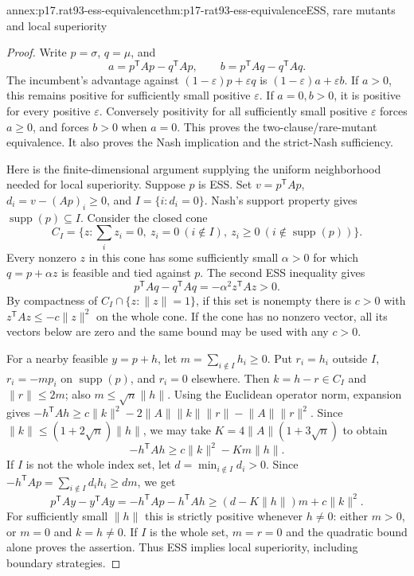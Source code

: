 \begin{annexitem}{annex:p17.rat93-ess-equivalence}{thm:p17-rat93-ess-equivalence}{ESS, rare mutants and local superiority}
\begin{proof}
Write \(p=\sigma\), \(q=\mu\), and
\[
 a=p^{\mathsf T}Ap-q^{\mathsf T}Ap,\qquad
 b=p^{\mathsf T}Aq-q^{\mathsf T}Aq.
\]
The incumbent's advantage against \((1-\varepsilon)p+\varepsilon q\)
is \((1-\varepsilon)a+\varepsilon b\). If \(a>0\), this remains
positive for sufficiently small positive \(\varepsilon\). If
\(a=0,b>0\), it is positive for every positive \(\varepsilon\).
Conversely positivity for all sufficiently small positive
\(\varepsilon\) forces \(a\geq0\), and forces \(b>0\) when
\(a=0\). This proves the two-clause/rare-mutant equivalence. It
also proves the Nash implication and the strict-Nash sufficiency.

Here is the finite-dimensional argument supplying the uniform
neighborhood needed for local superiority. Suppose \(p\) is ESS.
Set \(v=p^{\mathsf T}Ap\),
\(d_i=v-(Ap)_i\geq0\), and
\(I=\{i:d_i=0\}\). Nash's support property gives
\(\operatorname{supp}(p)\subseteq I\).
Consider the closed cone
\[
 C_I=\{z:\sum_i z_i=0,\ z_i=0\ (i\notin I),
                \ z_i\geq0\ (i\notin\operatorname{supp}(p))\}.
\]
Every nonzero \(z\) in this cone has some sufficiently small
\(\alpha>0\) for which \(q=p+\alpha z\) is feasible and tied
against \(p\). The second ESS inequality gives
\[
 p^{\mathsf T}Aq-q^{\mathsf T}Aq=-\alpha^2z^{\mathsf T}Az>0.
\]
By compactness of \(C_I\cap\{z:\lVert z\rVert=1\}\), if this
set is nonempty there is \(c>0\) with
\(z^{\mathsf T}Az\leq-c\lVert z\rVert^2\) on the whole cone.
If the cone has no nonzero vector, all its vectors below are zero
and the same bound may be used with any \(c>0\).

For a nearby feasible \(y=p+h\), let
\(m=\sum_{i\notin I}h_i\geq0\). Put \(r_i=h_i\) outside
\(I\), \(r_i=-mp_i\) on \(\operatorname{supp}(p)\), and
\(r_i=0\) elsewhere. Then \(k=h-r\in C_I\) and
\(\lVert r\rVert\leq2m\); also \(m\leq\sqrt n\lVert h\rVert\).
Using the Euclidean operator norm, expansion gives
\(-h^{\mathsf T}Ah\geq c\lVert k\rVert^2
-2\lVert A\rVert\lVert k\rVert\lVert r\rVert
-\lVert A\rVert\lVert r\rVert^2\).
Since \(\lVert k\rVert\leq(1+2\sqrt n)\lVert h\rVert\),
we may take \(K=4\lVert A\rVert(1+3\sqrt n)\) to obtain
\[
 -h^{\mathsf T}Ah\geq c\lVert k\rVert^2-Km\lVert h\rVert.
\]
If \(I\) is not the whole index set, let
\(d=\min_{i\notin I}d_i>0\). Since
\(-h^{\mathsf T}Ap=\sum_{i\notin I}d_ih_i\geq dm\), we get
\[
 p^{\mathsf T}Ay-y^{\mathsf T}Ay
 =-h^{\mathsf T}Ap-h^{\mathsf T}Ah
 \geq (d-K\lVert h\rVert)m+c\lVert k\rVert^2.
\]
For sufficiently small \(\lVert h\rVert\) this is strictly
positive whenever \(h\ne0\): either \(m>0\), or \(m=0\) and
\(k=h\ne0\). If \(I\) is the whole set, \(m=r=0\) and the
quadratic bound alone proves the assertion. Thus ESS implies local
superiority, including boundary strategies.


\end{proof}
\end{annexitem}
